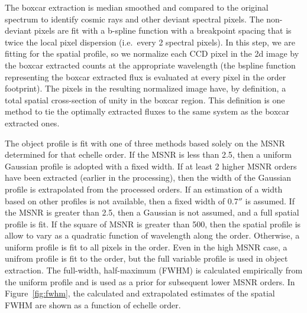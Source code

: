 \documentclass[12pt,preprint]{aastex}
\begin{document}
The boxcar extraction is median smoothed and compared to the original spectrum
to identify cosmic rays and other deviant spectral pixels.  The non-deviant 
pixels are fit with a b-spline function with a breakpoint spacing that is twice
the local pixel dispersion (i.e.\ every 2 spectral pixels).
In this step, we are fitting for the spatial profile, so we normalize each 
CCD pixel in the 2d image by the boxcar extracted counts at the appropriate 
wavelength (the bspline function representing the boxcar extracted flux is
evaluated at every pixel in the order footprint).  
The pixels in the resulting normalized image have, by definition, a total 
spatial cross-section of unity in the boxcar region.
This definition is one method to tie the optimally extracted fluxes to the same 
system as the boxcar extracted ones. 

The object profile is fit with one of three methods based solely on the
MSNR determined for that echelle order.  If the MSNR is less than 2.5, 
then a uniform Gaussian profile is adopted with a fixed width.  If at least 2 
higher MSNR orders have been extracted (earlier in the processing), then 
the width of the Gaussian profile is extrapolated from the processed orders.
If an estimation of a width based on other profiles is not available, then a
fixed width of 0.7$''$ is assumed.  If the MSNR is greater than 2.5, then a
Gaussian is not assumed, and a full spatial profile is fit.  If the square
of MSNR is greater than 500, then the spatial profile is allow to vary as
a quadratic function of wavelength along the order.  
Otherwise, a uniform profile is fit to all pixels in the order.  
Even in the high MSNR case, a unifrom profile
is fit to the order, but the full variable profile is used in object 
extraction.  The full-width, half-maximum (FWHM) is calculated empirically
from the uniform profile and is used as a prior for subsequent lower MSNR 
orders.  In Figure~\ref{fig:fwhm}, the calculated and extrapolated 
estimates of the spatial FWHM are shown as a function of echelle order.
\end{document}
